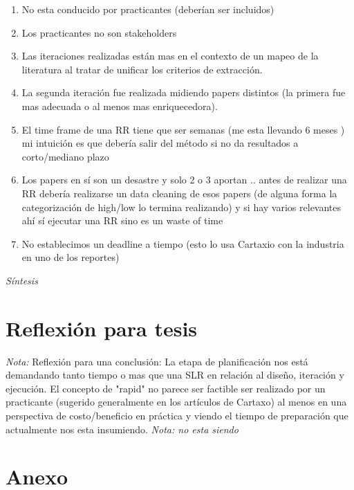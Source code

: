 \documentclass[conference]{IEEEtran}
\begin{document}
\begin{enumerate}
\item No esta conducido por practicantes (deberían ser incluidos)
\item Los practicantes no son stakeholders
\item Las iteraciones realizadas están mas en el contexto de un mapeo de la literatura al tratar de unificar los criterios de extracción. 
\item La segunda iteración fue realizada midiendo papers distintos (la primera fue mas adecuada o al menos mas enriquecedora). 
\item El time frame de una RR tiene que ser semanas (me esta llevando 6 meses ) mi intuición es que  debería salir del método si no da resultados a corto/mediano plazo
\item Los papers en sí son un desastre y solo 2 o 3 aportan .. antes de realizar una RR debería realizarse un data cleaning de esos papers (de alguna forma la categorización de high/low lo termina realizando) y si hay varios relevantes ahí sí ejecutar una RR sino es un waste of time 
\item No establecimos un deadline a tiempo (esto lo usa Cartaxio con la industria en uno de los reportes)
\end{enumerate}





\textit {Síntesis}


\section{Reflexión para tesis}
\textit{Nota: } Reflexión para una conclusión: La etapa de planificación nos está demandando tanto tiempo o mas que una SLR en relación al diseño, iteración y ejecución. El concepto de "rapid"  no parece ser factible ser realizado por un practicante (sugerido generalmente en los artículos de Cartaxo) al menos en una perspectiva de costo/beneficio en práctica y viendo el tiempo de preparación que actualmente nos esta insumiendo. 
\textit{Nota: no esta siendo }




\section*{Anexo}
\end{document}
